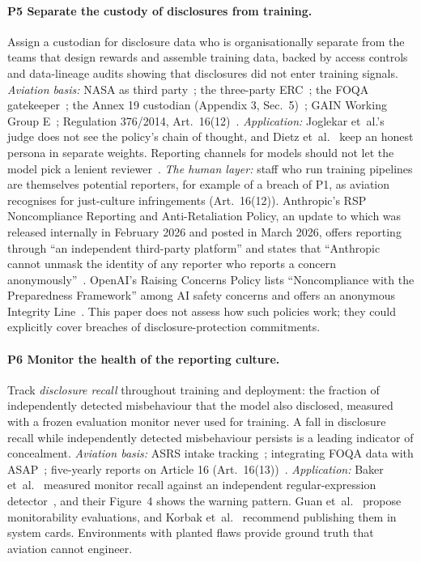 \documentclass[11pt]{article}
\begin{document}
\paragraph{P5 Separate the custody of disclosures from training.} Assign a custodian for disclosure data who is organisationally separate from the teams that design rewards and assemble training data, backed by access controls and data-lineage audits showing that disclosures did not enter training signals. \emph{Aviation basis:} NASA as third party~\cite[paras.~1, 6.2]{faa2021}; the three-party ERC~\cite[para.~A.8]{faa2020}; the FOQA gatekeeper~\cite[para.~6.b(5)]{faa2004}; the Annex 19 custodian (Appendix 3, Sec.~5)~\cite{icao2016}; GAIN Working Group E~\cite[Sec.~3.3]{gain2004}; Regulation 376/2014, Art.~16(12)~\cite{eu376}. \emph{Application:} Joglekar et~al.'s~\cite{joglekar2025} judge does not see the policy's chain of thought, and Dietz et~al.~\cite{dietz2026} keep an honest persona in separate weights. Reporting channels for models should not let the model pick a lenient reviewer~\cite{golchin2026}. \emph{The human layer:} staff who run training pipelines are themselves potential reporters, for example of a breach of P1, as aviation recognises for just-culture infringements (Art.~16(12)). Anthropic's RSP Noncompliance Reporting and Anti-Retaliation Policy, an update to which was released internally in February 2026 and posted in March 2026, offers reporting through ``an independent third-party platform'' and states that ``Anthropic cannot unmask the identity of any reporter who reports a concern anonymously''~\cite{anthropic2026rsp}. OpenAI's Raising Concerns Policy lists ``Noncompliance with the Preparedness Framework'' among AI safety concerns and offers an anonymous Integrity Line~\cite{openai_concerns}. This paper does not assess how such policies work; they could explicitly cover breaches of disclosure-protection commitments.

\paragraph{P6 Monitor the health of the reporting culture.} Track \emph{disclosure recall} throughout training and deployment: the fraction of independently detected misbehaviour that the model also disclosed, measured with a frozen evaluation monitor never used for training. A fall in disclosure recall while independently detected misbehaviour persists is a leading indicator of concealment. \emph{Aviation basis:} ASRS intake tracking~\cite{nasaasrs}; integrating FOQA data with ASAP~\cite[para.~7.c(9)]{faa2004}; five-yearly reports on Article 16 (Art.~16(13))~\cite{eu376}. \emph{Application:} Baker et~al.~\cite{baker2025} measured monitor recall against an independent regular-expression detector~\cite[Table~1]{baker2025}, and their Figure~4 shows the warning pattern. Guan et~al.~\cite{guan2025} propose monitorability evaluations, and Korbak et~al.~\cite{korbak2025} recommend publishing them in system cards. Environments with planted flaws provide ground truth that aviation cannot engineer.
\end{document}
